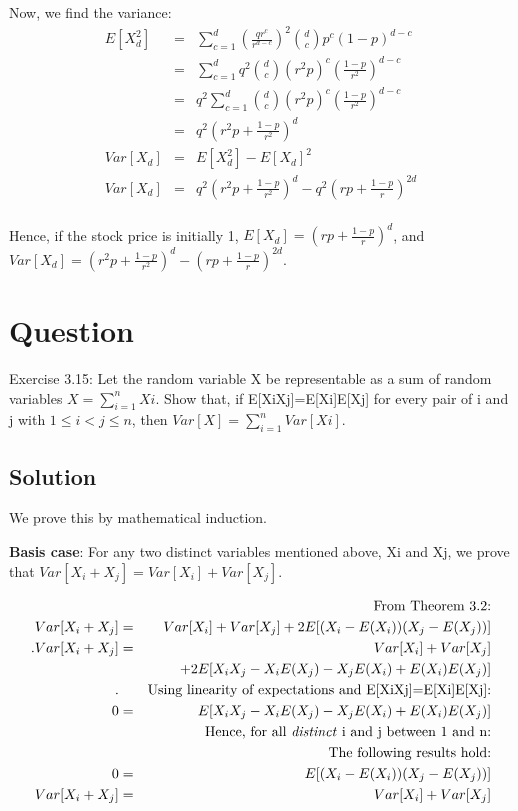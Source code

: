 \documentclass[10pt]{article}
\begin{document}
Now, we find the variance:
\begin{eqnarray}
E[X_{d}^{2}] &=& \sum_{c=1}^{d} (\frac{qr^{c}}{r^{d-c}})^{2}\binom{d}{c}p^{c}(1-p)^{d-c} \\
&=&  \sum_{c=1}^{d} q^{2}\binom{d}{c}(r^{2}p)^{c}(\frac{1-p}{r^{2}})^{d-c}\\
&=&  q^{2}\sum_{c=1}^{d} \binom{d}{c}(r^{2}p)^{c}(\frac{1-p}{r^{2}})^{d-c}\\
&=& q^{2}(r^{2}p+\frac{1-p}{r^{2}})^{d}\\
Var[X_{d}] &=& E[X_{d}^{2}] - E[X_{d}]^{2}\\
Var[X_{d}] &=& q^{2}(r^{2}p+\frac{1-p}{r^{2}})^{d} - q^{2}(rp+\frac{1-p}{r})^{2d}\\
\end{eqnarray}

Hence, if the stock price is initially 1, $E[X_{d}]=(rp+\frac{1-p}{r})^{d}$, and $Var[X_{d}] = (r^{2}p+\frac{1-p}{r^{2}})^{d} - (rp+\frac{1-p}{r})^{2d}$.

\section{Question}

Exercise 3.15: Let the random variable X be representable as a sum of random variables $X=\sum_{i=1}^{n}Xi$. Show that, if E[XiXj]=E[Xi]E[Xj] for every pair of i and j with $1\leq i<j \leq n$, then $Var[X] = \sum_{i=1}^{n}Var[Xi]$.

\subsection{Solution}
We prove this by mathematical induction.

\textbf{Basis case}: For any two distinct variables mentioned above, Xi and Xj, we prove that $Var[X_{i}+X_{j}]=Var[X_{i}]+Var[X_{j}]$.

\begin{eqnarray}
&&\text{From Theorem 3.2:}\\
Var[X_{i}+X_{j}]&=&Var[X_{i}]+Var[X_{j}]+2E[(X_{i}-E(X_{i}))(X_{j}-E(X_{j}))]\\.
Var[X_{i}+X_{j}]&=&Var[X_{i}]+Var[X_{j}]\\
&&+2E[X_{i}X_{j}-X_{i}E(X_{j})-X_{j}E(X_{i})+E(X_{i})E(X_{j})]\\.
&&\text{Using linearity of expectations and E[XiXj]=E[Xi]E[Xj]:}\\
0&=&E[X_{i}X_{j}-X_{i}E(X_{j})-X_{j}E(X_{i})+E(X_{i})E(X_{j})]\\
&&\text{Hence, for all \textit{distinct} i and j between 1 and n:}\\
&&\text{The following results hold:}\\
0&=&E[(X_{i}-E(X_{i}))(X_{j}-E(X_{j}))]\\
Var[X_{i}+X_{j}]&=&Var[X_{i}]+Var[X_{j}]\\
\end{eqnarray}
\end{document}
